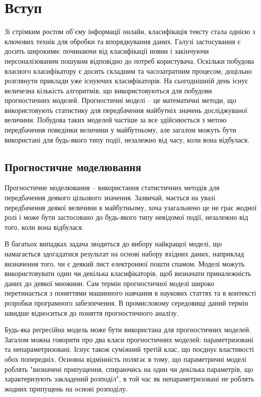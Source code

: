 \section{Вступ}
Зі стрімким ростом об'єму інформації онлайн, класифікація тексту стала однією з ключових
технік для обробки та впорядкування даних. Галузі застосування є досить широкими:
починаючи від класифікації новин і закінчуючи персоналізованим пошуком відповідно до
потреб користувача. Оскільки побудова власного класифікатору є досить складним та
часозатратним процесом, доцільно розглянути приклади уже існуючих класифікаторів.
На сьогоднішній день існує величезна кількість алгоритмів, що використовуються для побудови прогностичних моделей. Прогностичні моделі – це математичні методи, що використовують статистику для передбачення майбутніх значень досліджуваної величини. Побудова таких моделей частіше за все здійснюється з метою передбачення поведінки величини у майбутньому, але загалом можуть бути використані для будь-якого типу події, незалежно від часу, коли вона відбулася.

\subsection{Прогностичне моделювання}
Прогностичне моделювання – використання статистичних методів для передбачення деякого цільового значення. Зазвичай, мається на увазі передбачення деякої величини в майбутньому, хоча узагальнено це не грає жодної ролі і може бути застосовано до будь-якого типу невідомої події, незалежно від того, коли вона відбулася.

В багатьох випадках задача зводиться до вибору найкращої моделі, що намагається здогадатися результат на основі набору вхідних даних, наприклад визначення того, чи є деякий лист електронної пошти спамом. Моделі можуть використовувати один чи декілька класифікаторів, щоб визначати приналежність даних до деякої множини. Сам термін прогностичної моделі широко перетинається з поняттями машинного навчання в наукових статтях та в контексті розробки програмного забезпечення. В промисловому середовищі даний термін швидше відноситься до поняття прогностичного аналізу.

Будь-яка регресійна модель може бути використана для прогностичних моделей. Загалом можна говорити про два класи прогностичних моделей: параметризовані та непараметризовані. Існує також суміжний третій клас, що поєднує властивості обох попередніх. Основна відмінність полягає в тому, що параметричні моделі роблять "визначені припущення, спираючись на один чи декілька параметрів, що характеризують закладений розподіл", в той час як непараметризовані не роблять жодних припущень на основі розподілу.

